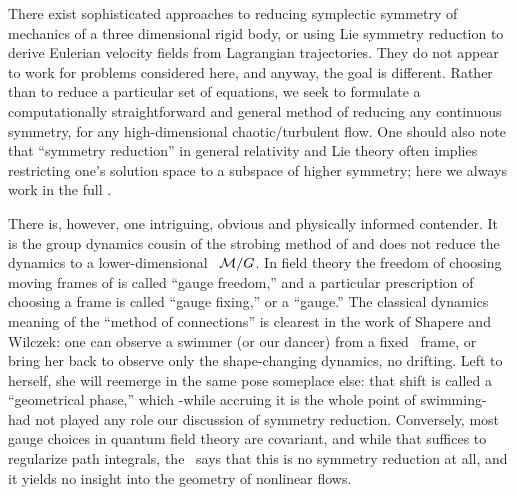 \documentclass[aip,cha,reprint,
secnumarabic,
nofootinbib, tightenlines,
nobibnotes, showkeys, showpacs,
groupedaddress
]{revtex4-1}
\begin{document}
There exist sophisticated approaches to reducing symplectic symmetry of
mechanics of a three dimensional rigid body, or using Lie
symmetry reduction to derive Eulerian velocity fields from Lagrangian
trajectories. They do not appear to work for problems
considered here, and anyway, the goal is different. Rather than to reduce
a particular set of equations, we seek to formulate a computationally
straightforward and general method of reducing any continuous symmetry,
for any high-dimensional chaotic/turbulent flow. One should also note
that ``symmetry reduction'' in general relativity and Lie
theory often implies restricting one's solution space to a subspace of
higher symmetry; here we always work in the full \statesp.

There is, however, one intriguing, obvious and physically informed
contender.
It is the group dynamics cousin of the strobing method of 
and does not reduce the dynamics to a lower-dimensional \reducedsp\
${\cal M}/G$. In field theory the freedom of choosing moving frames of
\reffig{fig:BeThMovFr} is called ``gauge freedom,'' and a particular
prescription of choosing a frame is called ``gauge fixing,'' or a
``gauge.'' The classical dynamics meaning of the ``method of
connections'' is clearest in the work of Shapere and
Wilczek: one can observe a swimmer (or our dancer)
from a fixed \slice\ frame, or bring her back to observe only the
shape-changing dynamics, no drifting. Left to herself, she will reemerge
in the same pose someplace else: that shift is called a ``geometrical
phase,'' which -while accruing it is the whole point of swimming- had not
played any role our discussion of symmetry reduction. Conversely, most gauge
choices in quantum field theory are covariant, and while that suffices to
regularize path integrals, the \mslices\ says that this is no symmetry
reduction at all, and it yields no insight into the geometry of nonlinear
flows.
\end{document}
